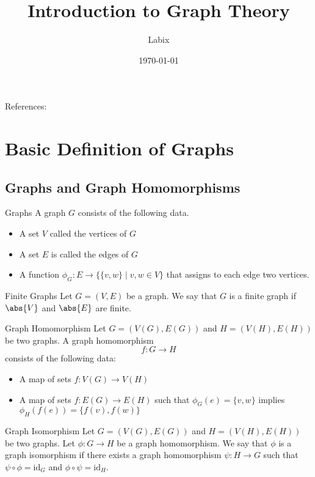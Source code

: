 \documentclass[a4paper]{article}
\title{Introduction to Graph Theory}
\author{Labix}
\date{\today}
\begin{document}
\maketitle
\begin{abstract}
\end{abstract}

References: 
\pagebreak
\tableofcontents

\pagebreak
\section{Basic Definition of Graphs}
\subsection{Graphs and Graph Homomorphisms}
\begin{defn}{Graphs}{} A graph $G$ consists of the following data. 
\begin{itemize}
\item A set $V$ called the vertices of $G$
\item A set $E$ is called the edges of $G$
\item A function $\phi_G:E\to\{\{v,w\}\;|\;v,w\in V\}$ that assigns to each edge two vertices. 
\end{itemize}
\end{defn}

\begin{defn}{Finite Graphs}{} Let $G=(V,E)$ be a graph. We say that $G$ is a finite graph if $\abs{V}$ and $\abs{E}$ are finite. 
\end{defn}

\begin{defn}{Graph Homomorphism}{} Let $G=(V(G),E(G))$ and $H=(V(H),E(H))$ be two graphs. A graph homomorphism $$f:G\to H$$ consists of the following data: 
\begin{itemize}
\item A map of sets $f:V(G)\to V(H)$
\item A map of sets $f:E(G)\to E(H)$ such that $\phi_G(e)=\{v,w\}$ implies $\phi_H(f(e))=\{f(v),f(w)\}$
\end{itemize}
\end{defn}

\begin{defn}{Graph Isomorphism}{} Let $G=(V(G),E(G))$ and $H=(V(H),E(H))$ be two graphs. Let $\phi:G\to H$ be a graph homomorphism. We say that $\phi$ is a graph isomorphism if there exists a graph homomorphism $\psi:H\to G$ such that $\psi\circ\phi=\text{id}_G$ and $\phi\circ\psi=\text{id}_H$. 
\end{defn}
\end{document}
